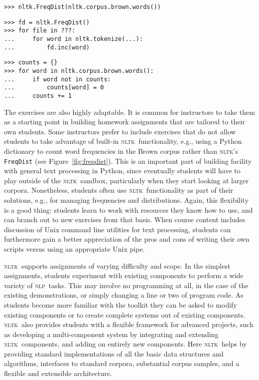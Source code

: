 \documentclass[11pt]{article}
\newcommand{\NLP}{\textsc{nlp}}
\newcommand{\NLTK}{\textsc{nltk}}
\newcommand{\code}[1]{\texttt{\small #1}}
\begin{document}
\begin{figure*}
{\small
\begin{verbatim}
>>> nltk.FreqDist(nltk.corpus.brown.words())
\end{verbatim}}

{\small
\begin{verbatim}
>>> fd = nltk.FreqDist()
>>> for file in ???:
...     for word in nltk.tokenize(...):
...         fd.inc(word)
\end{verbatim}}
\medskip

{\small
\begin{verbatim}
>>> counts = {}
>>> for word in nltk.corpus.brown.words():
...     if word not in counts:
...         counts[word] = 0
...     counts += 1
\end{verbatim}}
\caption{Different ways to build up a frequency distribution of words in the Brown Corpus}
\label{fig:freqdist}
\end{figure*}


The exercises are also highly adaptable. It is common for instructors
to take them as a starting point in building homework assignments that
are tailored to their own students.  Some instructors prefer to
include exercises that do not allow students to take advantage of
built-in \NLTK\ functionality, e.g., using a Python dictionary to
count word frequencies in the Brown corpus rather than \NLTK 's
\code{FreqDist} (see Figure~\ref{fig:freqdist}).  This is an important
part of building facility with general text processing in Python,
since eventually students will have to play outside of the \NLTK\
sandbox, particularly when they start looking at larger
corpora. Nonetheless, students often use \NLTK\ functionality as part
of their solutions, e.g., for managing frequencies and
distributions. Again, this flexibility is a good thing: students learn
to work with resources they know how to use, and can branch out to new
exercises from that basis. When course content includes discussion of
Unix command line utilities for text processing, students can
furthermore gain a better appreciation of the pros and cons of writing
their own scripts versus using an appropriate Unix pipe.


\NLTK\ supports assignments of varying difficulty and scope. In the
simplest assignments, students experiment with existing components to
perform a wide variety of \NLP\ tasks. This may involve no programming
at all, in the case of the existing demonstrations, or simply changing
a line or two of program code. As students become more familiar with
the toolkit they can be asked to modify existing components or to
create complete systems out of existing components. \NLTK\ also provides
students with a flexible framework for advanced projects, such as
developing a multi-component system by integrating and extending \NLTK\
components, and adding on entirely new components. Here \NLTK\ helps by
providing standard implementations of all the basic data structures
and algorithms, interfaces to standard corpora, substantial corpus
samples, and a flexible and extensible architecture.
\end{document}
